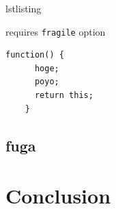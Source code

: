 
\begin{frame}[fragile]{lstlisting}{}

  requires \texttt{fragile} option

  \begin{lstlisting}[style=default,caption={[JS]JavaScript}]
    function() {
      hoge;
      poyo;
      return this;
    }
  \end{lstlisting}
\end{frame}

\subsection{fuga}


\section{Conclusion}


